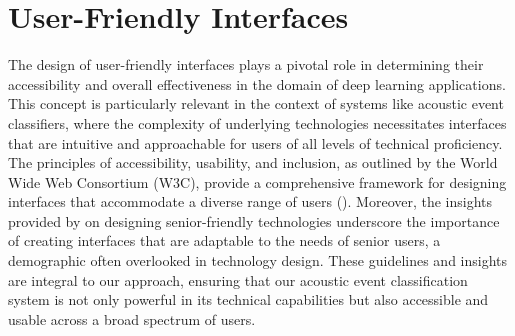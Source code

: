 \section{User-Friendly Interfaces}

The design of user-friendly interfaces plays a pivotal role in determining their accessibility and overall effectiveness in the domain of deep learning applications. This concept is particularly relevant in the context of systems like acoustic event classifiers, where the complexity of underlying technologies necessitates interfaces that are intuitive and approachable for users of all levels of technical proficiency. The principles of accessibility, usability, and inclusion, as outlined by the World Wide Web Consortium (W3C), provide a comprehensive framework for designing interfaces that accommodate a diverse range of users (\cite{w3AccessibilityUsability}). Moreover, the insights provided by \cite{SeniorfriendlyTechnologies} on designing senior-friendly technologies underscore the importance of creating interfaces that are adaptable to the needs of senior users, a demographic often overlooked in technology design. These guidelines and insights are integral to our approach, ensuring that our acoustic event classification system is not only powerful in its technical capabilities but also accessible and usable across a broad spectrum of users.